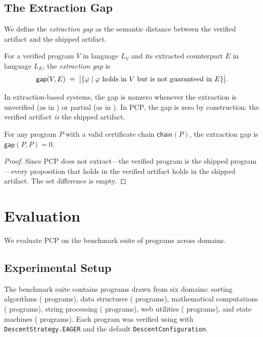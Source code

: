 \documentclass[11pt]{article}
\newcommand{\pcp}{\textsc{PCP}}           %
\newcommand{\certchain}{\mathsf{chain}}
\begin{document}
\subsection{The Extraction Gap}

We define the \emph{extraction gap} as the semantic distance between
the verified artifact and the shipped artifact.

\begin{definition}\label{def:extraction-gap}
For a verified program $V$ in language $L_V$ and its extracted
counterpart $E$ in language $L_E$, the \emph{extraction gap} is
\[
  \mathsf{gap}(V, E) \;=\;
  \bigl|\{\varphi \mid \varphi \text{ holds in } V \text{ but is not
  guaranteed in } E\}\bigr|.
\]
\end{definition}

In extraction-based systems, the gap is nonzero whenever the
extraction is unverified (as in \Coq{}) or partial (as in \LEAN{}).
In \pcp{}, the gap is zero by construction: the verified artifact
\emph{is} the shipped artifact.

\begin{proposition}\label{prop:zero-gap}
For any \Python{} program $P$ with a valid certificate chain
$\certchain(P)$, the extraction gap is $\mathsf{gap}(P, P) = 0$.
\end{proposition}

\begin{proof}
Since \pcp{} does not extract---the verified program is the
shipped program---every proposition that holds in the verified
artifact holds in the shipped artifact.  The set difference is
empty.
\end{proof}

\section{Evaluation}\label{sec:evaluation}

We evaluate \pcp{} on the \JuGeo{} benchmark suite of
\expTotalPrograms{} \Python{} programs across \expDomainCount{}
domains.

\subsection{Experimental Setup}

The benchmark suite contains \expTotalPrograms{} programs drawn from
six domains: sorting algorithms (\expDomainSortCount{} programs),
data structures (\expDomainDsCount{} programs), mathematical
computations (\expDomainMathCount{} programs), string processing
(\expDomainStrCount{} programs), web utilities (\expDomainWebCount{}
programs), and state machines (\expDomainSmCount{} programs).  Each
program was verified using \JuGeo{} with \texttt{DescentStrategy.EAGER}
and the default \texttt{DescentConfiguration}.
\end{document}
